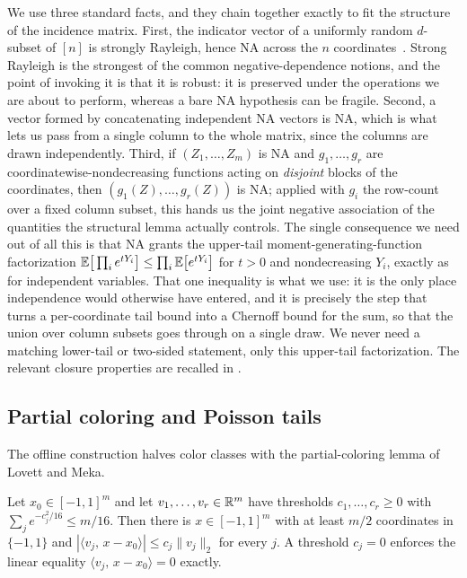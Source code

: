 We use three standard facts, and they chain together exactly to fit the structure of the incidence matrix. First, the
indicator vector of a uniformly random $d$-subset of $[n]$ is strongly Rayleigh, hence NA across the $n$
coordinates~\cite{BorceaBrandenLiggett2009}. Strong Rayleigh is the strongest of the common negative-dependence notions,
and the point of invoking it is that it is robust: it is preserved under the operations we are about to perform, whereas a
bare NA hypothesis can be fragile. Second, a vector formed by concatenating independent NA vectors is NA, which is what lets
us pass from a single column to the whole matrix, since the columns are drawn independently. Third, if
$(Z_1,\dots,Z_m)$ is NA and $g_1,\dots,g_r$ are coordinatewise-nondecreasing functions acting on \emph{disjoint} blocks of
the coordinates, then $(g_1(Z),\dots,g_r(Z))$ is NA; applied with $g_i$ the row-count over a fixed column subset, this hands
us the joint negative association of the quantities the structural lemma actually controls. The single consequence we need
out of all this is that NA grants the upper-tail moment-generating-function factorization
$\mathbb{E}\big[\prod_i e^{tY_i}\big]\le\prod_i\mathbb{E}\big[e^{tY_i}\big]$ for $t>0$ and nondecreasing $Y_i$, exactly as for
independent variables. That one inequality is what we use: it is the only place independence would otherwise have entered,
and it is precisely the step that turns a per-coordinate tail bound into a Chernoff bound for the sum, so that the union
over column subsets goes through on a single draw. We never need a matching lower-tail or two-sided statement, only this
upper-tail factorization. The relevant closure properties are recalled in .

\subsection{Partial coloring and Poisson tails}\label{sec:tools}

The offline construction halves color classes with the partial-coloring lemma of Lovett and Meka.

\begin{lemma}\label{lem:LM}
Let $x_0\in[-1,1]^m$ and let $v_1,\dots,v_r\in\mathbb{R}^m$ have thresholds $c_1,\dots,c_r\ge 0$ with
$\sum_{j} e^{-c_j^2/16}\le m/16$. Then there is $x\in[-1,1]^m$ with at least $m/2$ coordinates in $\{-1,1\}$ and
$|\langle v_j,\,x-x_0\rangle|\le c_j\|v_j\|_2$ for every $j$. A threshold $c_j=0$ enforces the linear equality
$\langle v_j,\,x-x_0\rangle=0$ exactly.
\end{lemma}

